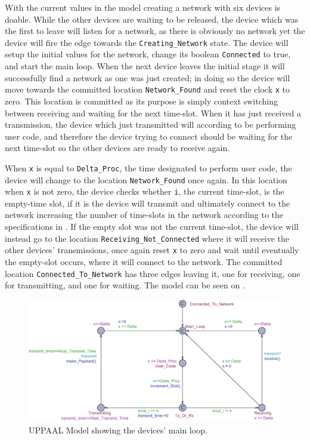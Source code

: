 With the current values in the model creating a network with six devices is doable.
While the other devices are waiting to be released, the device which was the first to leave will listen for a network, as there is obviously no network yet the device will fire the edge towards the \texttt{Creating\_Network} state.
The device will setup the initial values for the network, change its boolean \texttt{Connected} to true, and start the main loop.
When the next device leaves the initial stage it will successfully find a network as one was just created; in doing so the device will move towards the committed location \texttt{Network\_Found} and reset the clock \texttt{x} to zero.
This location is committed as its purpose is simply context switching between receiving and waiting for the next time-slot.
When it has just received a transmission, the device which just transmitted will according to  be performing user code, and therefore the device trying to connect should be waiting for the next time-slot so the other devices are ready to receive again.

\bigskip \noindent
When \texttt{x} is equal to \texttt{Delta\_Proc}, the time designated to perform user code, the device will change to the location \texttt{Network\_Found} once again.
In this location when \texttt{x} is not zero, the device checks whether \texttt{i}, the current time-slot, is the empty-time slot, if it is the device will transmit and ultimately connect to the network increasing the number of time-slots in the network according to the specifications in .
If the empty slot was not the current time-slot, the device will instead go to the location \texttt{Receiving\_Not\_Connected} where it will receive the other devices' transmissions, once again reset \texttt{x} to zero and wait until eventually the empty-slot occurs, where it will connect to the network.
The committed location \texttt{Connected\_To\_Network} has three edges leaving it, one for receiving, one for transmitting, and one for waiting.
The model can be seen on .

\begin{figure}
  \includegraphics[width=1\textwidth]{Figures/Model/Device_Connected.pdf} 
\caption{UPPAAL Model showing the devices' main loop.}
\label{fig:UPPAAL_Connected}
\end{figure}

